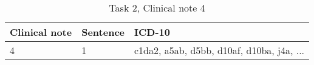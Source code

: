 \begin{table}[!htb] \footnotesize \center
\caption{Task 2, Clinical note 4 \label{tab:t2c4}}
\begin{tabularx}{\textwidth}{l l X}
    \toprule
    Clinical note & Sentence & ICD-10 \\
    \midrule
	 4 & 1 & c1da2, a5ab, d5bb, d10af, d10ba, j4a, ... \\
	\bottomrule
\end{tabularx}
\end{table}